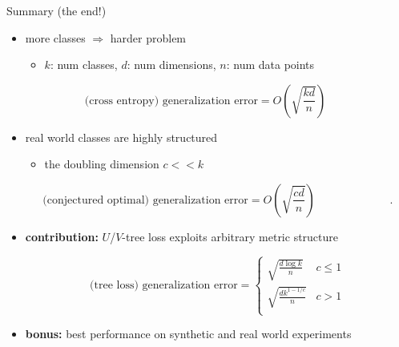 \begin{frame}{Summary (the end!)}

\begin{itemize}
\item more classes $\Rightarrow$ harder problem
\begin{itemize}
\item $k$: num classes, $d$: num dimensions, $n$: num data points
\end{itemize}
\begin{equation*}
\text{(cross entropy) generalization error}
=
O\left(\sqrt{\frac{kd}{n}}\right)
~~~~~~~~~~
\end{equation*}
\item real world classes are highly structured

\begin{itemize}
\item the doubling dimension $c <\!\!< k$

\end{itemize}
\begin{equation*}
\text{(conjectured optimal) generalization error}
=
O\left(\sqrt{\frac{cd}{n}}\right)
~~~~~~~~~~~~~~~~~~~~~~~~~~~~~~.
\end{equation*}

\item \textbf{contribution:} $U$/$V$-tree loss exploits arbitrary metric structure

\begin{equation*}
\text{(tree loss) generalization error} = 
\begin{cases}
\sqrt{\frac{d\log k}{n}} & c\le 1 \\
\sqrt{\frac{dk^{1-1/c}}{n}} & c>1 \\
\end{cases}
\end{equation*}

\item \textbf{bonus:} best performance on synthetic and real world experiments

\end{itemize}

\vspace{-4in}
\end{frame}





